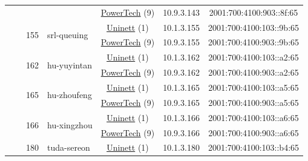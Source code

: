 \begin{small}
\begin{center}
\begin{longtable}{|c|c|c|c|c|c|c|c|}
  &  &  &  & \multicolumn{2}{|c|}{\tiny{\href{http://www.powertech.no}{PowerTech} (9)}} & \tiny{10.9.3.143} & \tiny{2001:700:4100:903::8f:65} \\* \cline{3-3}\cline{4-4}\cline{5-5}\cline{6-6}\cline{7-7}\cline{8-8}
  &  & \multirow{2}{*}{\tiny{155}} & \multicolumn{1}{|l|}{\multirow{2}{*}{\tiny{srl-queuing}}} & \multicolumn{2}{|c|}{\tiny{\href{https://www.uninett.no}{Uninett} (1)}} & \tiny{10.1.3.155} & \tiny{2001:700:4100:103::9b:65} \\* \cline{5-5}\cline{6-6}\cline{7-7}\cline{8-8}
  &  &  &  & \multicolumn{2}{|c|}{\tiny{\href{http://www.powertech.no}{PowerTech} (9)}} & \tiny{10.9.3.155} & \tiny{2001:700:4100:903::9b:65} \\* \cline{3-3}\cline{4-4}\cline{5-5}\cline{6-6}\cline{7-7}\cline{8-8}
  &  & \multirow{2}{*}{\tiny{162}} & \multicolumn{1}{|l|}{\multirow{2}{*}{\tiny{hu-yuyintan}}} & \multicolumn{2}{|c|}{\tiny{\href{https://www.uninett.no}{Uninett} (1)}} & \tiny{10.1.3.162} & \tiny{2001:700:4100:103::a2:65} \\* \cline{5-5}\cline{6-6}\cline{7-7}\cline{8-8}
  &  &  &  & \multicolumn{2}{|c|}{\tiny{\href{http://www.powertech.no}{PowerTech} (9)}} & \tiny{10.9.3.162} & \tiny{2001:700:4100:903::a2:65} \\* \cline{3-3}\cline{4-4}\cline{5-5}\cline{6-6}\cline{7-7}\cline{8-8}
  &  & \multirow{2}{*}{\tiny{165}} & \multicolumn{1}{|l|}{\multirow{2}{*}{\tiny{hu-zhoufeng}}} & \multicolumn{2}{|c|}{\tiny{\href{https://www.uninett.no}{Uninett} (1)}} & \tiny{10.1.3.165} & \tiny{2001:700:4100:103::a5:65} \\* \cline{5-5}\cline{6-6}\cline{7-7}\cline{8-8}
  &  &  &  & \multicolumn{2}{|c|}{\tiny{\href{http://www.powertech.no}{PowerTech} (9)}} & \tiny{10.9.3.165} & \tiny{2001:700:4100:903::a5:65} \\* \cline{3-3}\cline{4-4}\cline{5-5}\cline{6-6}\cline{7-7}\cline{8-8}
  &  & \multirow{2}{*}{\tiny{166}} & \multicolumn{1}{|l|}{\multirow{2}{*}{\tiny{hu-xingzhou}}} & \multicolumn{2}{|c|}{\tiny{\href{https://www.uninett.no}{Uninett} (1)}} & \tiny{10.1.3.166} & \tiny{2001:700:4100:103::a6:65} \\* \cline{5-5}\cline{6-6}\cline{7-7}\cline{8-8}
  &  &  &  & \multicolumn{2}{|c|}{\tiny{\href{http://www.powertech.no}{PowerTech} (9)}} & \tiny{10.9.3.166} & \tiny{2001:700:4100:903::a6:65} \\* \cline{3-3}\cline{4-4}\cline{5-5}\cline{6-6}\cline{7-7}\cline{8-8}
  &  & \multirow{2}{*}{\tiny{180}} & \multicolumn{1}{|l|}{\multirow{2}{*}{\tiny{tuda-sereon}}} & \multicolumn{2}{|c|}{\tiny{\href{https://www.uninett.no}{Uninett} (1)}} & \tiny{10.1.3.180} & \tiny{2001:700:4100:103::b4:65} \\* \cline{5-5}\cline{6-6}\cline{7-7}\cline{8-8}

\end{longtable}
\end{center}
\end{small}
